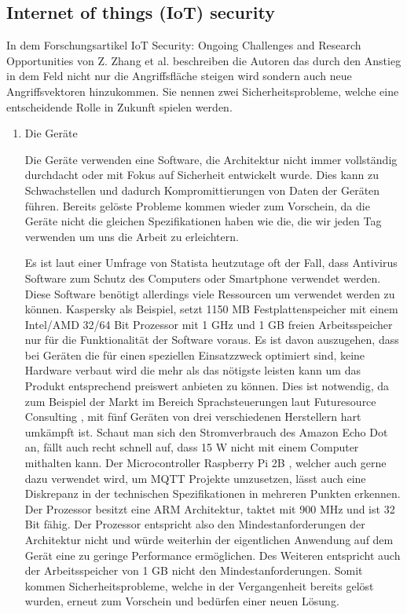         \subsection{Internet of things (IoT) security}
        In dem Forschungsartikel \glqq IoT Security: Ongoing Challenges and Research Opportunities\grqq{} von Z. Zhang et al. \cite{6978614} beschreiben die Autoren das durch den Anstieg in dem Feld nicht nur die Angriffsfläche steigen wird sondern auch neue Angriffsvektoren hinzukommen.
        Sie nennen zwei Sicherheitsprobleme, welche eine entscheidende Rolle in Zukunft spielen werden.
        \begin{enumerate}
            \item Die Geräte
            
            Die Geräte verwenden eine Software, die Architektur nicht immer vollständig durchdacht oder mit Fokus auf Sicherheit entwickelt wurde. Dies kann zu Schwachstellen und dadurch Kompromittierungen von Daten der Geräten führen. Bereits gelöste Probleme kommen wieder zum Vorschein, da die Geräte nicht die gleichen Spezifikationen haben wie die, die wir jeden Tag verwenden um uns die Arbeit zu erleichtern. 
        
            Es ist laut einer Umfrage von Statista \cite{kaspersky_lab_2019}
            heutzutage oft der Fall, dass Antivirus Software zum Schutz des Computers oder Smartphone verwendet werden. Diese Software benötigt allerdings viele Ressourcen um verwendet werden zu können.
            Kaspersky \cite{ao_kaspersky_lab_2018_1}
            als Beispiel, setzt 1150 MB Festplattenspeicher mit einem Intel/AMD 32/64 Bit Prozessor mit 1 GHz und 1 GB freien Arbeitsspeicher nur für die Funktionalität der Software voraus. Es ist davon auszugehen, dass bei Geräten die für einen speziellen Einsatzzweck optimiert sind, keine Hardware verbaut wird die mehr als das nötigste leisten kann um das Produkt entsprechend preiswert anbieten zu können. Dies ist notwendig, da zum Beispiel der Markt im Bereich Sprachsteuerungen laut Futuresource Consulting \cite{futuresource_consulting_ltd_2019}, mit fünf Geräten von drei verschiedenen Herstellern hart umkämpft ist. Schaut man sich den Stromverbrauch des Amazon Echo Dot \cite{amazon_de_alle_produkte_2018} an, fällt auch recht schnell auf, dass 15 W nicht mit einem Computer mithalten kann. 
            Der Microcontroller Raspberry Pi 2B \cite{raspberry_pi_foundation_2016}, welcher auch gerne dazu verwendet wird, um \ac{MQTT} Projekte umzusetzen, lässt auch eine Diskrepanz in der technischen Spezifikationen in mehreren Punkten erkennen. Der Prozessor besitzt eine ARM Architektur, taktet mit 900 MHz 
            und ist 32 Bit fähig. Der Prozessor entspricht also den Mindestanforderungen der Architektur nicht und würde weiterhin der eigentlichen Anwendung auf dem Gerät eine zu geringe Performance ermöglichen. Des Weiteren entspricht auch der Arbeitsspeicher von 1 GB nicht den Mindestanforderungen.
            Somit kommen Sicherheitsprobleme, welche in der Vergangenheit bereits gelöst wurden, erneut zum Vorschein und bedürfen einer neuen Lösung.
            

\end{enumerate}
